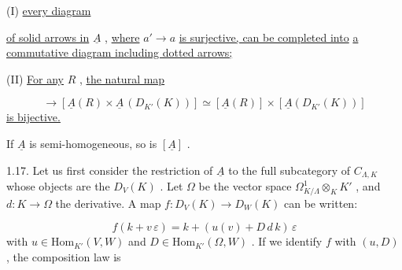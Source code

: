 (I)  \underline{every diagram}

\begin{center}
\end{center}
\underline{of solid arrows in} $\underline{A}$ , \underline{where} $a' \longrightarrow a$ \underline{is surjective, can be completed into} \underline{a commutative diagram including dotted arrows;}

(II)  \underline{For any} $R$ , \underline{the natural map}

\begin{equation*}
[\underline{A}(R \times_K D_{K'}(K))] \to [\underline{A}(R) \times \underline{A}\,(D_{K'}(K))] \simeq [\underline{A}(R)] \times [\underline{A}(D_{K'}(K))]
\end{equation*}
\underline{is bijective.}

If $\underline{A}$ is semi-homogeneous, so is $[\underline{A}]$ .

1.17.  Let us first consider the restriction of $\underline{A}$ to the full subcategory of $C_{\Lambda,K}$ whose objects are the $D_V(K)$ . Let $\Omega$ be the vector space $\Omega^1_{K/\Lambda} \otimes_K K'$ , and $d : K \to \Omega$ the derivative. A map $f : D_V(K) \to D_W(K)$ can be written:

\begin{equation*}
f(k + v\,\varepsilon) = k + (u(v) + D\,d\,k)\,\varepsilon
\end{equation*}
with $u \in \mathrm{Hom}_{K'}(V, W)$ and $D \in \mathrm{Hom}_{K'}(\Omega, W)$ . If we identify $f$ with $(u, D)$ , the composition law is

